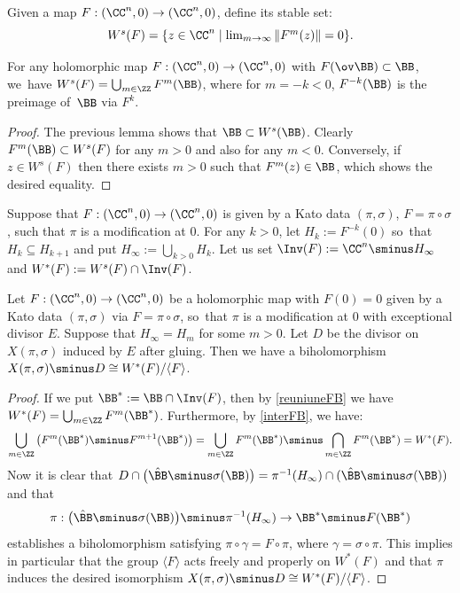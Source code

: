 Given a map $F:(\CC^n,0)\to (\CC^n,0)$, define its stable set:
\begin{equation*}\textstyle
W^s(F)=\{z\in\CC^n\mid \lim_{m\to\infty}\|F^m(z)\|=0\}.
\end{equation*}

\begin{lemma}\label{reuniuneFB}
For any holomorphic map $F:(\CC^n,0)\to (\CC^n,0)$ with $F(\ov \BB)\subset\BB$, we~have $W^s(F)=\bigcup_{m\in\ZZ}F^m(\BB)$, where for $m=-k<0$, $F^{-k}(\BB)$ is the preimage of~$\BB$ via $F^k$.
\end{lemma}
\begin{proof}
The previous lemma shows that $\BB\subset W^s(\BB)$. Clearly $F^m(\BB)\subset W^s(F)$ for any $m>0$ and also for any $m<0$. Conversely, if $z\in W^s(F)$ then there exists $m>0$ such that $F^m(z)\in\BB$, which shows the desired equality.
\end{proof}

Suppose that $F:(\CC^n,0)\to(\CC^n,0)$ is given by a Kato data $(\pi,\sigma)$, $F=\pi\circ\sigma$, such that $\pi$ is a modification at $0$.
For any $k>0$, let $H_k:=F^{-k}(0)$ so~that $H_k\subseteq H_{k+1}$ and put $H_\infty:=\bigcup_{k>0} H_k$. Let us set $\Inv(F):=\CC^n\sminus H_\infty$ and $W^*(F):=W^s(F)\cap\Inv(F)$.

\begin{proposition}\label{stableF}
Let $F:(\CC^n,0)\to(\CC^n,0)$ be a holomorphic map with $F(0)=0$ given by a Kato data $(\pi,\sigma)$ via $F=\pi\circ\sigma$, so~that $\pi$ is a modification at $0$ with exceptional divisor $E$. Suppose that $H_\infty=H_m$ for some $m>0$. Let $D$ be the divisor on $X(\pi,\sigma)$ induced by $E$ after gluing. Then we have a biholomorphism $X(\pi,\sigma)\sminus D\cong W^*(F)/\langle F\rangle$.
\end{proposition}
\begin{proof}
If we put $\BB^*:=\BB\cap\Inv(F)$, then by \ref{reuniuneFB} we have $W^*(F)=\bigcup_{m\in\ZZ}F^m(\BB^*)$. Furthermore, by \ref{interFB}, we have:
\begin{equation*}
\bigcup_{m\in\ZZ}\left(F^m(\BB^*)\sminus F^{m+1}(\BB^*)\right)=\bigcup_{m\in\ZZ}F^m(\BB^*)\sminus \bigcap_{m\in\ZZ}F^m(\BB^*)=W^*(F).
\end{equation*}
Now it is clear that $D\cap \bigl(\hat\BB\sminus \sigma(\BB) \bigr)=\pi^{-1}(H_\infty)\cap (\hat\BB\sminus \sigma(\BB))$ and that
\[
\pi:\bigl(\hat\BB\sminus \sigma(\BB)\bigr)\sminus \pi^{-1}(H_\infty)\to \BB^*\sminus F(\BB^*)
\]
establishes a biholomorphism satisfying $\pi\circ\gamma=F\circ \pi$, where $\gamma=\sigma\circ\pi$. This implies in particular that the group $\langle F\rangle$ acts freely and properly on $W^*(F)$ and that $\pi$ induces the desired isomorphism $X(\pi,\sigma)\sminus D\cong W^*(F)/\langle F\rangle$.
\end{proof}

